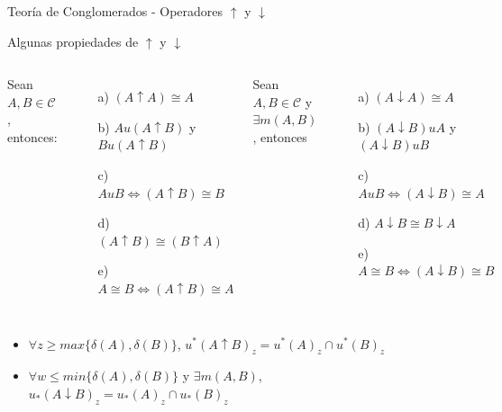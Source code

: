 \documentclass{beamer}
\begin{document}
\begin{frame}{Teoría de Conglomerados - Operadores $\uparrow$ y $\downarrow$}

\begin{center}
    Algunas propiedades de $\uparrow$ y $\downarrow$
\end{center}

\begin{columns}
	Sean $A,B \in \mathcal{C}$, entonces:
	\begin{itemize}
    	\item[a)] $(A \uparrow A) \cong A$\\
	    \item[b)] $Au(A \uparrow B)$ y $Bu(A \uparrow B)$\\
	    \item[c)] $AuB \Leftrightarrow (A\uparrow B) \cong B$\\
	    \item[d)] $(A \uparrow B) \cong (B \uparrow A)$ \\
	    \item[e)] $A \cong B \Leftrightarrow (A \uparrow B) \cong A$
	\end{itemize}



	Sean $A,B \in \mathcal{C}$ y $\exists m(A,B)$, entonces
	\begin{itemize}
	    \item[a)] $(A \downarrow A) \cong A$\\
    	\item[b)] $(A \downarrow B)uA$ y $(A \downarrow B)uB$\\
	    \item[c)] $AuB \Leftrightarrow (A \downarrow B) \cong A$\\
	    \item[d)] $A \downarrow B \cong B \downarrow A$ \\
	    \item[e)] $A \cong B \Leftrightarrow (A \downarrow B) \cong B$
	\end{itemize}
\end{columns}
	\begin{itemize}
 		\item $\forall z \ge max\{\delta(A),\delta(B)\}$, $u^*(A\uparrow B)_z= u^*(A)_z\cap u^*(B)_z$
		\item $\forall w \le min\{\delta(A),\delta(B)\}$ y $\exists m(A,B)$, $u_*(A\downarrow B)_z= u_*(A)_z \cap u_*(B)_z$
	\end{itemize}

\end{frame}
\end{document}
